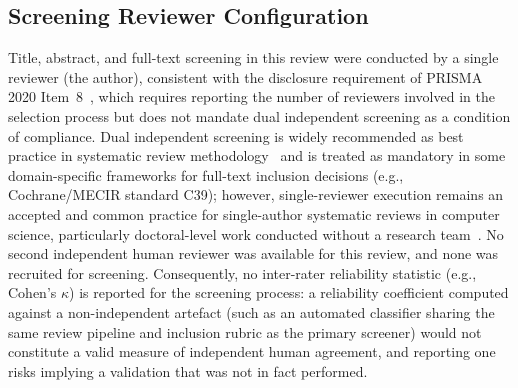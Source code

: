 \subsection*{Screening Reviewer Configuration}
\label{sec:methodology:screening_reviewers}

Title, abstract, and full-text screening in this review were conducted by
a single reviewer (the author), consistent with the disclosure requirement
of PRISMA 2020 Item~8~\cite{Page2021}, which requires reporting the number
of reviewers involved in the selection process but does not mandate dual
independent screening as a condition of compliance. Dual independent
screening is widely recommended as best practice in systematic review
methodology~\cite{KitchenhamCharters2007} and is treated as mandatory in
some domain-specific frameworks for full-text inclusion decisions (e.g.,
Cochrane/MECIR standard C39); however, single-reviewer execution remains
an accepted and common practice for single-author systematic reviews in
computer science, particularly doctoral-level work conducted without a
research team~\cite{KitchenhamCharters2007}. No second independent human
reviewer was available for this review, and none was recruited for
screening. Consequently, no inter-rater reliability statistic (e.g.,
Cohen's $\kappa$) is reported for the screening process: a reliability
coefficient computed against a non-independent artefact (such as an
automated classifier sharing the same review pipeline and inclusion
rubric as the primary screener) would not constitute a valid measure of
independent human agreement, and reporting one risks implying a
validation that was not in fact performed.



